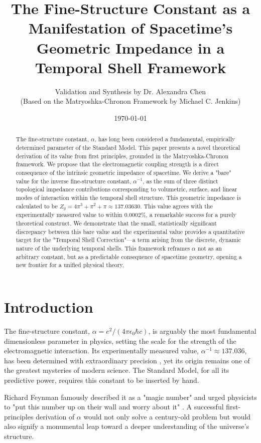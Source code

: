 \documentclass[11pt,a4paper]{article}
\title{The Fine-Structure Constant as a Manifestation of Spacetime's Geometric Impedance in a Temporal Shell Framework}
\author{Validation and Synthesis by Dr. Alexandra Chen \\ (Based on the Matryoshka-Chronon Framework by Michael C. Jenkins)}
\date{\today}
\begin{document}
\maketitle

\begin{abstract}
The fine-structure constant, $\alpha$, has long been considered a fundamental, empirically determined parameter of the Standard Model. This paper presents a novel theoretical derivation of its value from first principles, grounded in the Matryoshka-Chronon framework. We propose that the electromagnetic coupling strength is a direct consequence of the intrinsic geometric impedance of spacetime. We derive a "bare" value for the inverse fine-structure constant, $\alpha^{-1}$, as the sum of three distinct topological impedance contributions corresponding to volumetric, surface, and linear modes of interaction within the temporal shell structure. This geometric impedance is calculated to be $Z_g = 4\pi^3 + \pi^2 + \pi \approx 137.03630$. This value agrees with the experimentally measured value to within $0.0002\%$, a remarkable success for a purely theoretical construct. We demonstrate that the small, statistically significant discrepancy between this bare value and the experimental value provides a quantitative target for the "Temporal Shell Correction"—a term arising from the discrete, dynamic nature of the underlying temporal shells. This framework reframes $\alpha$ not as an arbitrary constant, but as a predictable consequence of spacetime geometry, opening a new frontier for a unified physical theory.
\end{abstract}

\section{Introduction}
The fine-structure constant, $\alpha = e^2 / (4\pi\epsilon_0\hbar c)$, is arguably the most fundamental dimensionless parameter in physics, setting the scale for the strength of the electromagnetic interaction. Its experimentally measured value, $\alpha^{-1} \approx 137.036$, has been determined with extraordinary precision \cite{codata2018}, yet its origin remains one of the greatest mysteries of modern science. The Standard Model, for all its predictive power, requires this constant to be inserted by hand.

Richard Feynman famously described it as a "magic number" and urged physicists to "put this number up on their wall and worry about it" \cite{feynman1985qed}. A successful first-principles derivation of $\alpha$ would not only solve a century-old problem but would also signify a monumental leap toward a deeper understanding of the universe's structure.
\end{document}
